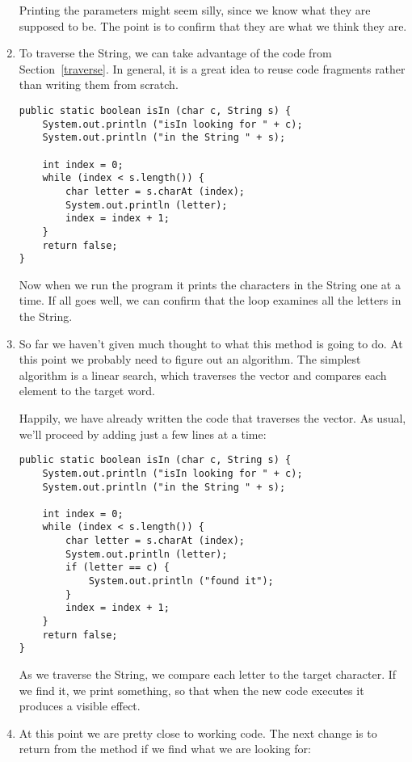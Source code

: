 \documentclass{book}
\begin{document}
\begin{enumerate}
Printing the parameters might seem silly, since we know what they
are supposed to be.  The point is to confirm that they are what we
think they are.


\item To traverse the String, we can take advantage of the code
from Section~\ref{traverse}.  In general, it is a great idea to
reuse code fragments rather than writing them from scratch.

\begin{verbatim}
public static boolean isIn (char c, String s) {
    System.out.println ("isIn looking for " + c);
    System.out.println ("in the String " + s);

    int index = 0;
    while (index < s.length()) {
        char letter = s.charAt (index);
        System.out.println (letter);
        index = index + 1;
    }
    return false;
}
\end{verbatim}

Now when we run the program it prints the characters in
the String one at a time.  
If all goes well, we can confirm that
the loop examines all the letters in the String.


\item So far we haven't given much thought to what this method
is going to do.  At this point we probably need to figure out an
algorithm.  The simplest algorithm is a linear search, which
traverses the vector and compares each element to the target word.

Happily, we have already written the code that traverses the
vector.  As usual, we'll proceed by adding just a few lines
at a time:

\begin{verbatim}
public static boolean isIn (char c, String s) {
    System.out.println ("isIn looking for " + c);
    System.out.println ("in the String " + s);

    int index = 0;
    while (index < s.length()) {
        char letter = s.charAt (index);
        System.out.println (letter);
        if (letter == c) {
            System.out.println ("found it");
        }
        index = index + 1;
    }
    return false;
}
\end{verbatim}

As we traverse the String, we compare each letter to the target
character.  If we find it, we print something, so
that when the new code executes it produces a visible effect.

\item At this point we are pretty close to working code.  The
next change is to return from the method if we find what we are
looking for:


\end{enumerate}
\end{document}
